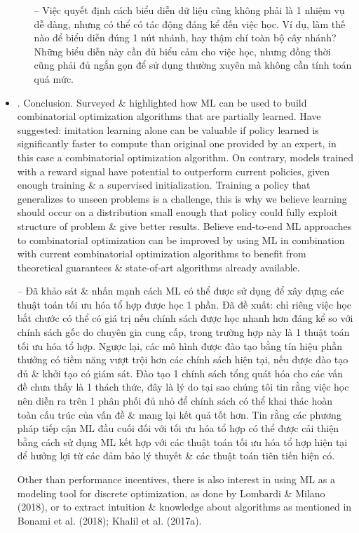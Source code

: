 \documentclass{article}
\begin{document}
\begin{itemize}
\begin{itemize}
        -- Việc quyết định cách biểu diễn dữ liệu cũng không phải là 1 nhiệm vụ dễ dàng, nhưng có thể có tác động đáng kể đến việc học. Ví dụ, làm thế nào để biểu diễn đúng 1 nút nhánh, hay thậm chí toàn bộ cây nhánh? Những biểu diễn này cần đủ biểu cảm cho việc học, nhưng đồng thời cũng phải đủ ngắn gọn để sử dụng thường xuyên mà không cần tính toán quá mức.
    \end{itemize}
    \item {. Conclusion.} Surveyed \& highlighted how ML can be used to build combinatorial optimization algorithms that are partially learned. Have suggested: imitation learning alone can be valuable if policy learned is significantly faster to compute than original one provided by an expert, in this  case a combinatorial optimization algorithm. On contrary, models trained with a reward signal have potential to outperform current policies, given enough training \& a supervised initialization. Training a policy that generalizes to unseen problems is a challenge, this is why we believe learning should occur on a distribution small enough that policy could fully exploit structure of problem \& give better results. Believe end-to-end ML approaches to combinatorial optimization can be improved by using ML in combination with current combinatorial optimization algorithms to benefit from theoretical guarantees \& state-of-art algorithms already available.

    -- Đã khảo sát \& nhấn mạnh cách ML có thể được sử dụng để xây dựng các thuật toán tối ưu hóa tổ hợp được học 1 phần. Đã đề xuất: chỉ riêng việc học bắt chước có thể có giá trị nếu chính sách được học nhanh hơn đáng kể so với chính sách gốc do chuyên gia cung cấp, trong trường hợp này là 1 thuật toán tối ưu hóa tổ hợp. Ngược lại, các mô hình được đào tạo bằng tín hiệu phần thưởng có tiềm năng vượt trội hơn các chính sách hiện tại, nếu được đào tạo đủ \& khởi tạo có giám sát. Đào tạo 1 chính sách tổng quát hóa cho các vấn đề chưa thấy là 1 thách thức, đây là lý do tại sao chúng tôi tin rằng việc học nên diễn ra trên 1 phân phối đủ nhỏ để chính sách có thể khai thác hoàn toàn cấu trúc của vấn đề \& mang lại kết quả tốt hơn. Tin rằng các phương pháp tiếp cận ML đầu cuối đối với tối ưu hóa tổ hợp có thể được cải thiện bằng cách sử dụng ML kết hợp với các thuật toán tối ưu hóa tổ hợp hiện tại để hưởng lợi từ các đảm bảo lý thuyết \& các thuật toán tiên tiến hiện có.

    Other than performance incentives, there is also interest in using ML as a modeling tool for discrete optimization, as done by Lombardi \& Milano (2018), or to extract intuition \& knowledge about algorithms as mentioned in Bonami et al. (2018); Khalil et al. (2017a).


\end{itemize}
\end{document}
